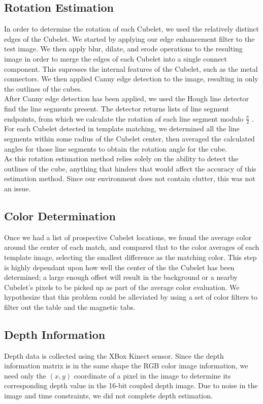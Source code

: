 \documentclass[conference]{IEEEtran}
\begin{document}
\subsection{Rotation Estimation}
In order to determine the rotation of each Cubelet, we used the relatively distinct edges of the Cubelet.  We started by applying our edge enhancement filter to the test image.  We then apply blur, dilate, and erode operations to the resulting image in order to merge the edges of each Cubelet into a single connect component.  This supresses the internal features of the Cubelet, such as the metal connectors. We then applied Canny edge detection to the image, resulting in only the outlines of the cubes.  \\

After Canny edge detection has been applied, we used the Hough line detector \cite{Hough} find the line segments present.  The detector returns lists of line segment endpoints, from which we calculate the rotation of each line segment modulo $ \frac{\pi}{2}$ .  For each Cubelet detected in template matching, we determined all the line segments within some radius of the Cubelet center, then averaged the calculated angles for those line segments to obtain the rotation angle for the cube. \\

As this rotation estimation method relies solely on the ability to detect the outlines of the cube, anything that hinders that would  affect the accuracy of this estimation method. Since our environment does not contain clutter, this was not an issue.

\subsection{Color Determination}
Once we had a list of prospective Cubelet locations, we found the average color around the center of each match, and compared that to the color averages of each template image, selecting the smallest difference as the matching color.  This step is highly dependant upon how well the center of the the Cubelet has been determined; a large enough offset will result in the background or a nearby Cubelet's pixels to be picked up as part of the average color evaluation. We hypothesize that this problem could be alleviated by using a set of color filters to filter out the table and the magnetic tabs.

\subsection{Depth Information}
Depth data is collected using the XBox Kinect sensor.  Since the depth information matrix is in the same shape the RGB color image information, we need only the $(x,y)$ coordinate of a pixel in the image to determine its corresponding depth value in the 16-bit coupled depth image. Due to noise in the image and time constraints, we did not complete depth estimation.
\end{document}
